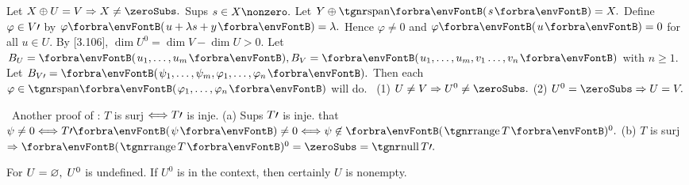 {
Let $X\oplus U=V\Rightarrow X\neq\zeroSubs.$ Sups $s\in X\nonzero.$ Let $Y\oplus\Span{s}=X.$\parSol{}
Define $\varphi\in V\prime$ by $\varphi\Par{u+\lambda s+y}=\lambda.$ Hence $\varphi\neq 0$ and $\varphi\Par{u}=0$ for all $u\in U.$\PfEnd\parSol{\vspace{4pt}}
\Or {} \;By [3.106], $\dim U^0=\dim V-\dim U>0.$\parSol{}
\Blind{\Or }\Or Let $B_U=\Par{u_1,\dots,u_m},B_V=\Par{u_1,\dots,u_m,v_1\dots,v_n}$ with $n\geqslant 1.$\parSol{}
\Blind{\Or}Let $B_{V\apostrophe}=\Par{\psi_1,\dots,\psi_m,\varphi_1,\dots,\varphi_n}.$ Then each $\varphi\in\Span{\varphi_1,\dots,\varphi_n}$ will do.\PfEnd\vspace{4pt}
\Corollary \,\,\,(1) $U\neq V\Rightarrow U^0\neq\zeroSubs.$ \; (2) $U^0=\zeroSubs\Rightarrow U=V.$\par
\Comment \,\,\,{\tgsc\large Another proof of \tgbfx[3.108]}: $T$ is surj $\Longleftrightarrow T\prime$ is inje.\parCom
(a) Sups $T\prime$ is inje. \NOTICE that $\psi\neq 0\Longleftrightarrow T\apostrophe\Par{\psi}\neq 0\Longleftrightarrow\psi\not\in\Par{\range T}{^0}.$\parCom
(b) $T$ is surj $\Rightarrow\Par{\range T}{^0}=\zeroSubs=\null T\apostrophe.$\PfEnd
\SepLine

\SepLine

\BulletPointX\NoteForSmall{[3.102]}\;\;For $U=\varnothing,\;U^0$ is undefined. If $U^0$ is in the context, then certainly $U$ is nonempty.
\SepLine

}
